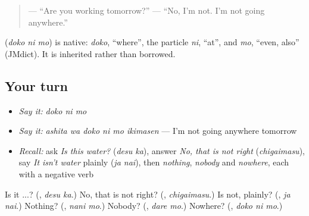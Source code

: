 \begin{quote}
\textbf{ } — \textquotedblleft{}Are you working tomorrow?\textquotedblright{} \textbf{ } — \textquotedblleft{}No, I'm not. I'm not going anywhere.\textquotedblright{}
\end{quote}

\begin{cousinweb}
\textbf{} (\emph{doko ni mo}) is native: \emph{doko}, \textquotedblleft{}where\textquotedblright{}, the particle \emph{ni}, \textquotedblleft{}at\textquotedblright{}, and \emph{mo}, \textquotedblleft{}even, also\textquotedblright{} (JMdict). It is inherited rather than borrowed.
\end{cousinweb}

\subsection*{Your turn}
\begin{itemize}
\raggedright
  \item \emph{Say it:} \emph{doko ni mo}
  \item \emph{Say it:} \emph{ashita wa doko ni mo ikimasen} — I'm not going anywhere tomorrow
  \item \emph{Recall:} ask \emph{Is this water?} (\emph{desu ka}), answer \emph{No, that is not right} (\emph{chigaimasu}), say \emph{It isn't water} plainly (\emph{ja nai}), then \emph{nothing}, \emph{nobody} and \emph{nowhere}, each with a negative verb
\end{itemize}

\begin{tcolorbox}[breakable,colback=teal!4,colframe=teal!35!black,title={Before you move on}]
Is it ...? (\textbf{}, \emph{desu ka}.) No, that is not right? (\textbf{}, \emph{chigaimasu}.) Is not, plainly? (\textbf{}, \emph{ja nai}.) Nothing? (\textbf{}, \emph{nani mo}.) Nobody? (\textbf{}, \emph{dare mo}.) Nowhere? (\textbf{}, \emph{doko ni mo}.)
\end{tcolorbox}

